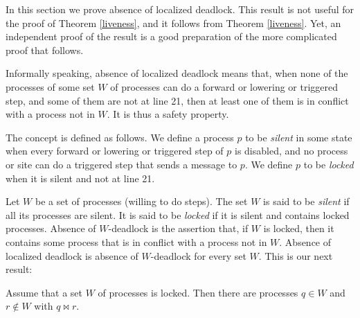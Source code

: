 \documentclass[10pt]{article} \usepackage[english]{babel}
\begin{document}
In this section we prove absence of localized deadlock.  This result
is not useful for the proof of Theorem \ref{liveness}, and it follows
from Theorem \ref{liveness}.  Yet, an independent proof of the result
is a good preparation of the more complicated proof that follows.

Informally speaking, absence of localized deadlock means that, when
none of the processes of some set $W$ of processes can do a forward or
lowering or triggered step, and some of them are not at line 21, then
at least one of them is in conflict with a process not in $W$. It is
thus a safety property.

The concept is defined as follows. We define a process $p$ to be
\emph{silent} in some state when every forward or lowering or
triggered step of $p$ is disabled, and no process or site can do a
triggered step that sends a message to $p$.  We define $p$ to be
\emph{locked} when it is silent and not at line 21.

Let $W$ be a set of processes (willing to do steps).  The set $W$ is
said to be \emph{silent} if all its processes are silent.  It is said
to be \emph{locked} if it is silent and contains locked processes.
Absence of $W$-deadlock is the assertion that, if $W$ is locked, then
it contains some process that is in conflict with a process not in
$W$.  Absence of localized deadlock is absence of $W$-deadlock for
every set $W$.  This is our next result:

\begin{theorem} \label{thm-no-deadlock} 
  Assume that a set $W$ of processes is locked. Then there are
  processes $q\in W$ and $r\notin W$ with $q \bowtie r$.
\end{theorem}
\end{document}
